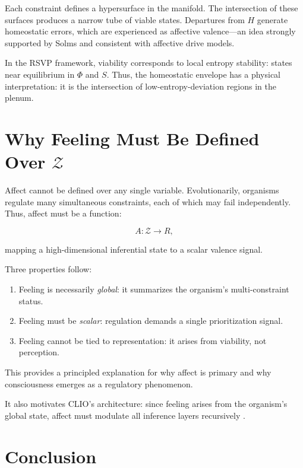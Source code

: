 \documentclass[12pt,oneside]{book}
\theoremstyle{plain}
\theoremstyle{definition}
\let\citep\parencite
\def\mathbb#1{#1}%
\begin{document}
Each constraint defines a hypersurface in the manifold.
The intersection of these surfaces produces a narrow tube of viable states.
Departures from $H$ generate homeostatic errors, which are experienced as
affective valence—an idea strongly supported by Solms
\citep{solms2021hidden}
and consistent with affective drive models.

In the RSVP framework, viability corresponds to local entropy stability:
states near equilibrium in $\Phi$ and $S$.
Thus, the homeostatic envelope has a physical interpretation:
it is the intersection of low-entropy-deviation regions in the plenum.

\section{Why Feeling Must Be Defined Over \texorpdfstring{$\mathcal{Z}$}{Z}}

Affect cannot be defined over any single variable.
Evolutionarily, organisms regulate many simultaneous constraints, each of which
may fail independently.
Thus, affect must be a function:

\[
A : \mathcal{Z} \rightarrow \mathbb{R},
\]

mapping a high-dimensional inferential state to a scalar valence signal.

Three properties follow:

\begin{enumerate}
    \item Feeling is necessarily \emph{global}:
          it summarizes the organism’s multi-constraint status.
    \item Feeling must be \emph{scalar}:
          regulation demands a single prioritization signal.
    \item Feeling cannot be tied to representation:
          it arises from viability, not perception.
\end{enumerate}

This provides a principled explanation for why affect is primary
\citep{solms2021hidden} and why consciousness emerges as a regulatory phenomenon.

It also motivates CLIO’s architecture:
since feeling arises from the organism’s global state,
affect must modulate all inference layers recursively
\citep{cheng2025cognitive}.

\section{Conclusion}
\end{document}
